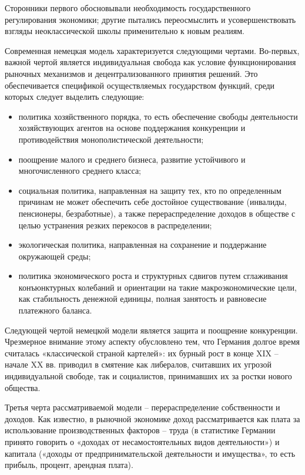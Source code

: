 \documentclass[14pt,a4paper]{article}
\begin{document}
    Сторонники первого обосновывали необходимость государственного регулирования экономики; другие пытались переосмыслить и усовершенствовать взгляды неоклассической школы применительно к новым реалиям.
    \par
    Современная немецкая модель характеризуется следующими чертами.
    Во-первых, важной чертой является индивидуальная свобода как условие функционирования рыночных механизмов и децентрализованного принятия решений.
    Это обеспечивается спецификой осуществляемых государством функций, среди которых следует выделить следующие:
    \begin{itemize}
        \item политика хозяйственного порядка, то есть обеспечение свободы деятельности хозяйствующих агентов на основе поддержания конкуренции и противодействия монополистической деятельности;
        \item поощрение малого и среднего бизнеса, развитие устойчивого и многочисленного среднего класса;
        \item социальная политика, направленная на защиту тех, кто по определенным причинам не может обеспечить себе достойное существование (инвалиды, пенсионеры, безработные), а также перераспределение доходов в обществе с целью устранения резких перекосов в распределении;
        \item экологическая политика, направленная на сохранение и поддержание окружающей среды;
        \item политика экономического роста и структурных сдвигов путем сглаживания конъюнктурных колебаний и ориентации на такие макроэкономические цели, как стабильность денежной единицы, полная занятость и равновесие платежного баланса.
    \end{itemize}
    \par
    Следующей чертой немецкой модели является защита и поощрение конкуренции.
    Чрезмерное внимание этому аспекту обусловлено тем, что Германия долгое время считалась «классической страной картелей»: их бурный рост в конце XIX – начале XX вв. приводил в смятение как либералов, считавших их угрозой индивидуальной свободе, так и социалистов, принимавших их за ростки нового общества.
    \par
    Третья черта рассматриваемой модели – перераспределение собственности и доходов.
    Как известно, в рыночной экономике доход рассматривается как плата за использование производственных факторов – труда (в статистике Германии принято говорить о «доходах от несамостоятельных видов деятельности») и капитала («доходы от предпринимательской деятельности и имущества», то есть прибыль, процент, арендная плата).
\end{document}
